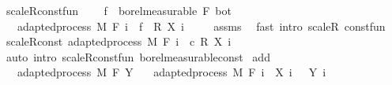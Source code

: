 \begin{isabellebody}
\ scaleR{\isacharunderscore}{\kern0pt}const{\isacharunderscore}{\kern0pt}fun{\isacharcolon}{\kern0pt}\ \isanewline
\ \ \ {\isachardoublequoteopen}f\ {\isasymin}\ borel{\isacharunderscore}{\kern0pt}measurable\ {\isacharparenleft}{\kern0pt}F\ bot{\isacharparenright}{\kern0pt}{\isachardoublequoteclose}\ \isanewline
\ \ \ {\isachardoublequoteopen}adapted{\isacharunderscore}{\kern0pt}process\ M\ F\ {\isacharparenleft}{\kern0pt}{\isasymlambda}i\ {\isasymxi}{\isachardot}{\kern0pt}\ f\ {\isasymxi}\ {\isacharasterisk}{\kern0pt}\isactrlsub R\ {\isacharparenleft}{\kern0pt}X\ i\ {\isasymxi}{\isacharparenright}{\kern0pt}{\isacharparenright}{\kern0pt}{\isachardoublequoteclose}\isanewline
%
\isadelimproof
\ \ %
\endisadelimproof
%
\isatagproof
{}\isamarkupfalse%
\ assms\ \isamarkupfalse%
\ {\isacharparenleft}{\kern0pt}fast\ intro{\isacharcolon}{\kern0pt}\ scaleR\ const{\isacharunderscore}{\kern0pt}fun{\isacharparenright}{\kern0pt}%
\endisatagproof
{\isafoldproof}%
%
\isadelimproof
\isanewline
%
\endisadelimproof
\isanewline
{}\isamarkupfalse%
\ scaleR{\isacharunderscore}{\kern0pt}const{\isacharcolon}{\kern0pt}\ {\isachardoublequoteopen}adapted{\isacharunderscore}{\kern0pt}process\ M\ F\ {\isacharparenleft}{\kern0pt}{\isasymlambda}i\ {\isasymxi}{\isachardot}{\kern0pt}\ c\ {\isacharasterisk}{\kern0pt}\isactrlsub R\ {\isacharparenleft}{\kern0pt}X\ i\ {\isasymxi}{\isacharparenright}{\kern0pt}{\isacharparenright}{\kern0pt}{\isachardoublequoteclose}%
\isadelimproof
\ %
\endisadelimproof
%
\isatagproof
{}\isamarkupfalse%
\ {\isacharparenleft}{\kern0pt}auto\ intro{\isacharcolon}{\kern0pt}\ scaleR{\isacharunderscore}{\kern0pt}const{\isacharunderscore}{\kern0pt}fun\ borel{\isacharunderscore}{\kern0pt}measurable{\isacharunderscore}{\kern0pt}const{\isacharparenright}{\kern0pt}%
\endisatagproof
{\isafoldproof}%
%
\isadelimproof
%
\endisadelimproof
\isanewline
\isanewline
{}\isamarkupfalse%
\ add{\isacharcolon}{\kern0pt}\isanewline
\ \ \ {\isachardoublequoteopen}adapted{\isacharunderscore}{\kern0pt}process\ M\ F\ Y{\isachardoublequoteclose}\isanewline
\ \ \ {\isachardoublequoteopen}adapted{\isacharunderscore}{\kern0pt}process\ M\ F\ {\isacharparenleft}{\kern0pt}{\isasymlambda}i\ {\isasymxi}{\isachardot}{\kern0pt}\ X\ i\ {\isasymxi}\ {\isacharplus}{\kern0pt}\ Y\ i\ {\isasymxi}{\isacharparenright}{\kern0pt}{\isachardoublequoteclose}\isanewline
%
\isadelimproof
%
\endisadelimproof
%
\isatagproof
{}\isamarkupfalse%
\ {\isacharminus}{\kern0pt}\isanewline

\end{isabellebody}
